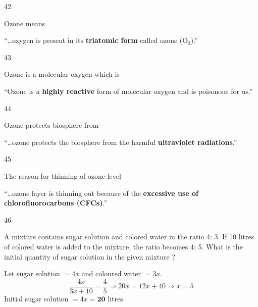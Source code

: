 \begin{question}{42}
{Ozone means\par}
\begin{explain}
``\ldots oxygen is present in its \textbf{triatomic form} called ozone (O$_3$).''
\end{explain}
\end{question}

\begin{question}{43}
{Ozone is a molecular oxygen which is\par}
\begin{explain}
``Ozone is a \textbf{highly reactive} form of molecular oxygen and is poisonous for us.''
\end{explain}
\end{question}

\begin{question}{44}
{Ozone protects biosphere from\par}
\begin{explain}
``\ldots ozone protects the biosphere from the harmful \textbf{ultraviolet radiations}.''
\end{explain}
\end{question}

\begin{question}{45}
{The reason for thinning of ozone level\par}
\begin{explain}
``\ldots ozone layer is thinning out because of the \textbf{excessive use of chlorofluorocarbons (CFCs)}.''
\end{explain}
\end{question}

\begin{question}{46}
{A mixture contains sugar solution and colored water in the ratio 4: 3. If 10 litres of colored water is added to the mixture, the ratio becomes 4: 5. What is the initial quantity of sugar solution in the given mixture ?\par}
\begin{explain}
Let sugar solution $=4x$ and coloured water $=3x$.
\[\frac{4x}{3x+10}=\frac45\Rightarrow20x=12x+40\Rightarrow x=5\]
Initial sugar solution $=4x=\mathbf{20}$ litres.
\end{explain}
\end{question}


